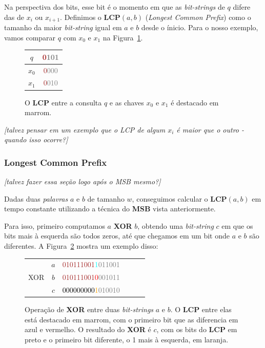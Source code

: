 Na perspectiva dos bits, esse bit é o momento em que as \textit{bit-strings} de
$q$ difere das de $x_i$ ou $x_{i+1}$. Definimos o \textbf{LCP}$(a,b)$
(\textit{Longest Common Prefix}) como o tamanho da maior \textit{bit-string}
igual em $a$ e $b$ desde o ínicio. Para o nosso exemplo, vamos comparar $q$ com
$x_0$ e $x_{1}$ na Figura~\ref{f:fusion-lcp-query-keys}.

\begin{figure}[!hbtp]
\centering
{
\bfseries\Large
\begin{tabular}{cc}
$q$ &
\textcolor{Brown}{0}\textcolor{Gray}{101} \\
\hline
$x_0$ &
\textcolor{Brown}{0}\textcolor{Gray}{000}  \\
$x_1$ &
\textcolor{Brown}{0}\textcolor{gray}{010}
\end{tabular}
} \caption{O \textbf{LCP} entre a consulta $q$ e as chaves $x_0$ e $x_1$ é
destacado em marrom.\label{f:fusion-lcp-query-keys}} 
\end{figure}

\textit{[talvez pensar em um exemplo que o LCP de algum $x_i$ é maior que o outro - quando isso ocorre?]}

\subsubsection{Longest Common Prefix}

\textit{[talvez fazer essa seção logo após o MSB mesmo?]}

Dadas duas \textit{palavras} $a$ e $b$ de tamanho $w$, conseguimos calcular o
\textbf{LCP}$(a,b)$ em tempo constante utilizando a técnica do \textbf{MSB}
vista anteriormente.

Para isso, primeiro computamos $a$ \textbf{XOR} $b$, obtendo uma
\textit{bit-string} $c$ em que os bits mais à esquerda são todos zeros, até que
chegamos em um bit onde $a$ e $b$ são diferentes. A
Figura~\ref{f:fusion-lcp-xor} mostra um exemplo disso:

\begin{figure}[h]
\centering
{
\bfseries\Large
\begin{tabular}{cccccc}
& $a$ &
\textcolor{Brown}{010111001}\textcolor{Cyan}{1}\textcolor{Gray}{011001} \\
XOR & $b$ &
\textcolor{Brown}{010111001}\textcolor{Red}{0}\textcolor{Gray}{001011}  \\
      \hline
& $c$ &
\textcolor{black}{000000000}\textcolor{Orange}{1}\textcolor{gray}{010010}
\end{tabular}
} \caption{Operação de \textbf{XOR} entre duas \textit{bit-strings} $a$ e $b$. O
\textbf{LCP} entre elas está destacado em marrom, com o primeiro bit que as
diferencia em azul e vermelho. O resultado do \textbf{XOR} é $c$, com os bits do
\textbf{LCP} em preto e o primeiro bit diferente, o 1 mais à esquerda, em
laranja.\label{f:fusion-lcp-xor}}
\end{figure}

